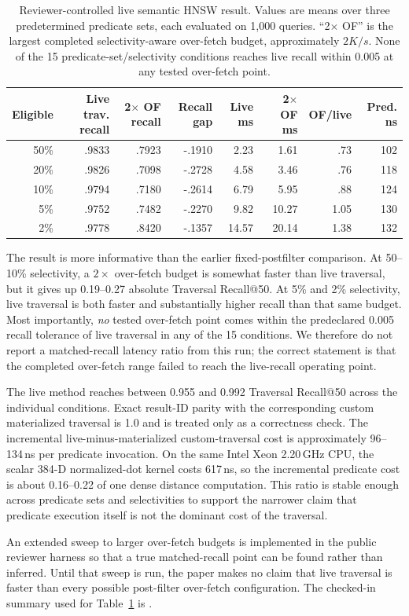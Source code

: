 \begin{table}[t]
\centering
\caption{Reviewer-controlled live semantic HNSW result. Values are means over three predetermined predicate sets, each evaluated on 1,000 queries. ``2$\times$ OF'' is the largest completed selectivity-aware over-fetch budget, approximately $2K/s$. None of the 15 predicate-set/selectivity conditions reaches live recall within 0.005 at any tested over-fetch point.}
\label{tab:livehnsw}
\small
\begin{tabular}{rrrrrrrr}
\toprule
Eligible & Live trav. recall & 2$\times$ OF recall & Recall gap & Live ms & 2$\times$ OF ms & OF/live & Pred. ns\\
\midrule
50\% & .9833 & .7923 & -.1910 & 2.23 & 1.61 & .73 & 102\\
20\% & .9826 & .7098 & -.2728 & 4.58 & 3.46 & .76 & 118\\
10\% & .9794 & .7180 & -.2614 & 6.79 & 5.95 & .88 & 124\\
5\%  & .9752 & .7482 & -.2270 & 9.82 & 10.27 & 1.05 & 130\\
2\%  & .9778 & .8420 & -.1357 & 14.57 & 20.14 & 1.38 & 132\\
\bottomrule
\end{tabular}
\end{table}

The result is more informative than the earlier fixed-postfilter comparison. At 50--10\% selectivity, a $2\times$ over-fetch budget is somewhat faster than live traversal, but it gives up 0.19--0.27 absolute Traversal Recall@50. At 5\% and 2\% selectivity, live traversal is both faster and substantially higher recall than that same budget. Most importantly, \emph{no} tested over-fetch point comes within the predeclared 0.005 recall tolerance of live traversal in any of the 15 conditions. We therefore do not report a matched-recall latency ratio from this run; the correct statement is that the completed over-fetch range failed to reach the live-recall operating point.

The live method reaches between 0.955 and 0.992 Traversal Recall@50 across the individual conditions. Exact result-ID parity with the corresponding custom materialized traversal is 1.0 and is treated only as a correctness check. The incremental live-minus-materialized custom-traversal cost is approximately 96--134\,ns per predicate invocation. On the same Intel Xeon 2.20\,GHz CPU, the scalar 384-D normalized-dot kernel costs 617\,ns, so the incremental predicate cost is about 0.16--0.22 of one dense distance computation. This ratio is stable enough across predicate sets and selectivities to support the narrower claim that predicate execution itself is not the dominant cost of the traversal.

An extended sweep to larger over-fetch budgets is implemented in the public reviewer harness so that a true matched-recall point can be found rather than inferred. Until that sweep is run, the paper makes no claim that live traversal is faster than every possible post-filter over-fetch configuration. The checked-in summary used for Table~\ref{tab:livehnsw} is .
